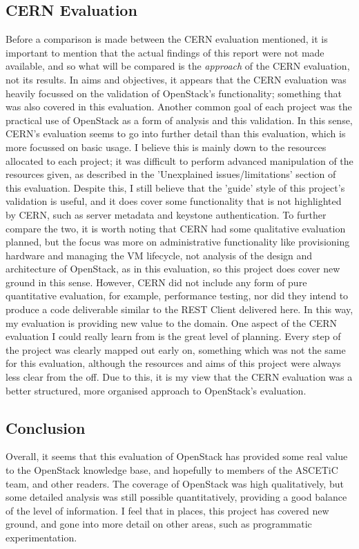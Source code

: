 \subsection{CERN Evaluation}
Before a comparison is made between the CERN evaluation\cite{cernevaluation} mentioned, it is important to mention that the actual findings of this report were not made available, and so what will be compared is the \textit{approach} of the CERN evaluation, not its results. 
In aims and objectives, it appears that the CERN evaluation was heavily focussed on the validation of OpenStack's functionality; something that was also covered in this evaluation. Another common goal of each project was the practical use of OpenStack as a form of analysis and this validation. In this sense, CERN's evaluation seems to go into further detail than this evaluation, which is more focussed on basic usage. I believe this is mainly down to the resources allocated to each project; it was difficult to perform advanced manipulation of the resources given, as described in the  'Unexplained issues/limitations' section of this evaluation. Despite this, I still believe that the 'guide' style of this project's validation is useful, and it does cover some functionality that is not highlighted by CERN, such as server metadata and keystone authentication. 
To further compare the two, it is worth noting that CERN had some qualitative evaluation planned, but the focus was more on administrative functionality like provisioning hardware and managing the VM lifecycle, not analysis of the design and architecture of OpenStack, as in this evaluation, so this project does cover new ground in this sense. However, CERN did not include any form of pure quantitative evaluation, for example, performance testing, nor did they intend to produce a code deliverable similar to the REST Client delivered here. In this way, my evaluation is providing new value to the domain. One aspect of the CERN evaluation I could really learn from is the great level of planning. Every step of the project was clearly mapped out early on, something which was not the same for this evaluation, although the resources and aims of this project were always less clear from the off. Due to this, it is my view that the CERN evaluation was a better structured, more organised approach to OpenStack's evaluation.

\subsection{Conclusion}
Overall, it seems that this evaluation of OpenStack has provided some real value to the OpenStack knowledge base, and hopefully to members of the ASCETiC team, and other readers. The coverage of OpenStack was high qualitatively, but some detailed analysis was still possible quantitatively, providing a good balance of the level of information. I feel that in places, this project has covered new ground, and gone into more detail on other areas, such as programmatic experimentation. 

